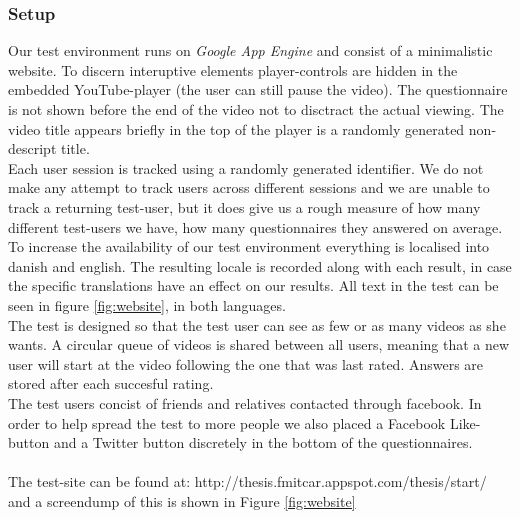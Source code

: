 \subsubsection{Setup}
%
Our test environment runs on \textit{Google App Engine} and consist of a minimalistic website. To discern interuptive elements player-controls are hidden in the embedded YouTube-player (the user can still pause the video). The questionnaire is not shown before the end of the video not to disctract the actual viewing. The video title appears briefly in the top of the player is a randomly generated non-descript title.\\
Each user session is tracked using a randomly generated identifier. We do not make any attempt to track users across different sessions and we are unable to track a returning test-user, but it does give us a rough measure of how many different test-users we have, how many questionnaires they answered on average.\\
To increase the availability of our test environment everything is localised into danish and english. The resulting locale is recorded along with each result, in case the specific translations have an effect on our results. All text in the test can be seen in figure \ref{fig:website}, in both languages.\\
The test is designed so that the test user can see as few or as many videos as she wants. A circular queue of videos is shared between all users, meaning that a new user will start at the video following the one that was last rated. Answers are stored after each succesful rating.\\
The test users concist of friends and relatives contacted through facebook. In order to help spread the test to more people we also placed a Facebook Like-button and a Twitter button discretely in the bottom of the questionnaires.\\\\
%
The test-site can be found at: http://thesis.fmitcar.appspot.com/thesis/start/ and a screendump of this is shown in Figure \ref{fig:website}
%
